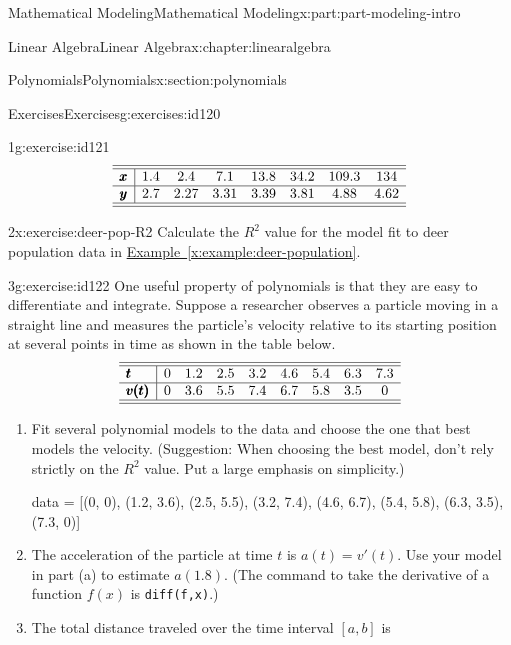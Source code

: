 \documentclass[oneside,10pt,]{book}
\newcommand{\xreffont}{\relax}
\newcommand{\mono}[1]{\texttt{#1}}
\numberwithin{equation}{section}
\begin{document}
\begin{partptx}{Mathematical Modeling}{}{Mathematical Modeling}{}{}{x:part:part-modeling-intro}
\begin{chapterptx}{Linear Algebra}{}{Linear Algebra}{}{}{x:chapter:linearalgebra}
\begin{sectionptx}{Polynomials}{}{Polynomials}{}{}{x:section:polynomials}
\begin{exercises-subsection}{Exercises}{}{Exercises}{}{}{g:exercises:id120}
\begin{divisionexercise}{1}{}{}{g:exercise:id121}
%
\begin{equation*}
\begin{array}{c|ccccccc}\hline\hline
\pmb{x} & 1.4 & 2.4 & 7.1 & 13.8 & 34.2 & 109.3 & 134 \\\hline
\pmb{y} & 2.7 & 2.27 & 3.31 & 3.39 & 3.81 & 4.88 & 4.62 \\\hline\hline
\end{array}
\end{equation*}
\end{divisionexercise}%
\begin{divisionexercise}{2}{}{}{x:exercise:deer-pop-R2}%
Calculate the \(R^2\) value for the model fit to deer population data in \hyperref[x:example:deer-population]{Example~{\xreffont\ref{x:example:deer-population}}}.%
\end{divisionexercise}%
\begin{divisionexercise}{3}{}{}{g:exercise:id122}%
One useful property of polynomials is that they are easy to differentiate and integrate. Suppose a researcher observes a particle moving in a straight line and measures the particle’s velocity relative to its starting position at several points in time as shown in the table below.%
%
\begin{equation*}
\begin{array}{l|cccccccc}\hline\hline
\pmb{t} & 0 & 1.2 & 2.5 & 3.2 & 4.6 & 5.4 & 6.3 & 7.3 \\\hline
\pmb{v(t)} & 0 & 3.6 & 5.5 & 7.4 & 6.7 & 5.8 & 3.5 & 0 \\\hline\hline
\end{array}
\end{equation*}
\begin{enumerate}[font=\bfseries,label=(\alph*),ref=\alph*]
\item{}Fit several polynomial models to the data and choose the one that best models the velocity. (Suggestion: When choosing the best model, don’t rely strictly on the \(R^2\) value. Put a large emphasis on simplicity.)%
\begin{sageinput}
data = [(0, 0), (1.2, 3.6), (2.5, 5.5), (3.2, 7.4), 
(4.6, 6.7), (5.4, 5.8), (6.3, 3.5), (7.3, 0)]
\end{sageinput}
\item{}The acceleration of the particle at time \(t\) is \(a(t) = v'(t)\). Use your model in part (a) to estimate \(a(1.8)\). (The command to take the derivative of a function \(f(x)\) is \mono{diff(f,x)}.)%
\item{}The total distance traveled over the time interval \([a, b]\) is%

\end{enumerate}
\end{divisionexercise}
\end{exercises-subsection}
\end{sectionptx}
\end{chapterptx}
\end{partptx}
\end{document}
